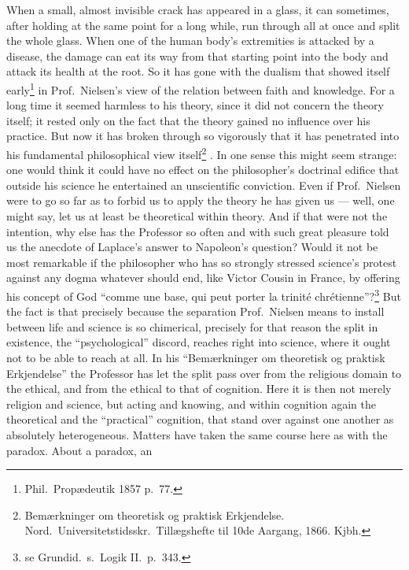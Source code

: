 \documentclass[12pt,a4paper]{book}
\renewcommand{\thefootnote}{*)}
\newcommand{\fnmark}[2]{\renewcommand{\thefootnote}{#1}\footnote{#2}%
  \renewcommand{\thefootnote}{*)}}
\newcommand{\opage}[1]{\marginnote{\footnotesize\textit{[#1]}}}
\begin{document}
\opage{55}When a small, almost invisible crack has appeared in a glass, it can
sometimes, after holding at the same point for a long while, run through all at
once and split the whole glass. When one of the human body's extremities is
attacked by a disease, the damage can eat its way from that starting point into
the body and attack its health at the root. So it has gone with the dualism
that showed itself early\fnmark{*)}{Phil.\ Propædeutik 1857 p.\ 77.} in Prof.\
Nielsen's view of the relation between faith and knowledge. For a long time it
seemed harmless to his theory, since it did not concern the theory itself; it
rested only on the fact that the theory gained no influence over his practice.
But now it has broken through so vigorously that it has penetrated into his
fundamental philosophical view itself\fnmark{**)}{Bemærkninger om theoretisk og
praktisk Erkjendelse. Nord.\ Universitetstidsskr.\ Tillægshefte til 10de
Aargang, 1866. Kjbh.}. In one sense this might seem strange: one would think it
could have no effect on
\opage{56}the philosopher's doctrinal edifice that outside his science he
entertained an unscientific conviction. Even if Prof.\ Nielsen were to go so
far as to forbid us to apply the theory he has given us --- well, one might
say, let us at least be theoretical within theory. And if that were not the
intention, why else has the Professor so often and with such great pleasure
told us the anecdote of Laplace's answer to Napoleon's question? Would it not
be most remarkable if the philosopher who has so strongly stressed science's
protest against any dogma whatever should end, like Victor Cousin in France, by
offering his concept of God ``comme une base, qui peut porter la trinité
chrétienne''?\fnmark{*)}{se Grundid.\ s.\ Logik II.\ p.\ 343.} But the fact is
that precisely because the separation Prof.\ Nielsen means to install between
life and science is so chimerical, precisely for that reason the split in
existence, the ``psychological'' discord, reaches right into science, where it
ought not to be able to reach at all. In his ``Bemærkninger om theoretisk og
praktisk Erkjendelse'' the Professor has let the split pass over from the
religious domain to the ethical, and from the ethical to that of cognition.
Here it is then not merely religion and science, but acting and knowing, and
within cognition again the theoretical and the ``practical'' cognition, that
stand over against one another as absolutely heterogeneous. Matters have
\opage{57}taken the same course here as with the paradox. About a paradox, an
\end{document}
